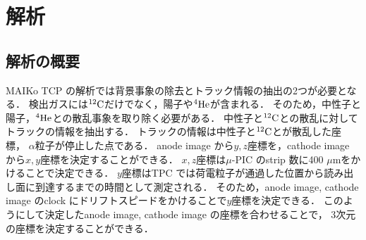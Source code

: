 \documentclass[../master]{subfiles}
\begin{document}
\chapter{解析}
%
%
%
\section{解析の概要}
MAIKo TCP の解析では背景事象の除去とトラック情報の抽出の2つが必要となる．
検出ガスには${}^{12}{\rm C}$だけでなく，陽子や${}^{4}{\rm He}$が含まれる．
そのため，中性子と陽子，${}^{4}{\rm He}$との散乱事象を取り除く必要がある．
中性子と${}^{12}{\rm C}$との散乱に対してトラックの情報を抽出する．
トラックの情報は中性子と${}^{12}{\rm C}$とが散乱した座標，
$\alpha$粒子が停止した点である．
anode image から$y, z$座標を，cathode image から$x, y$座標を決定することができる．
$x, z$座標は$\mu$-PIC のstrip 数に400 $\mu$mをかけることで決定できる．
$y$座標はTPC では荷電粒子が通過した位置から読み出し面に到達するまでの時間として測定される．
そのため，anode image, cathode image のclock にドリフトスピードをかけることで$y$座標を決定できる．
このようにして決定したanode image, cathode image の座標を合わせることで，
3次元の座標を決定することができる．
\end{document}
